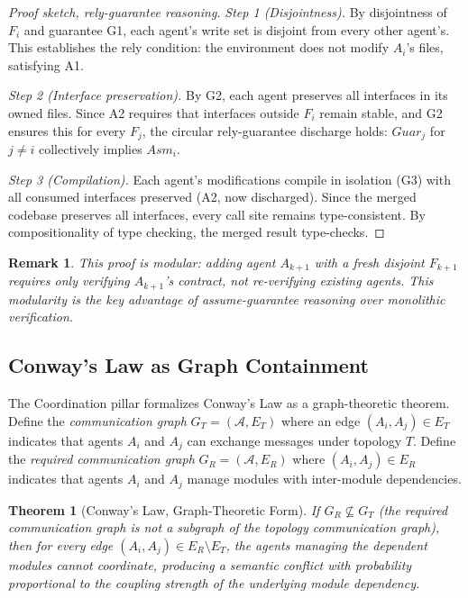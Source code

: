 \documentclass[11pt, a4paper, logo, copyright]{googledeepmind}
\newtheorem{theorem}{Theorem}[section]
\newtheorem*{remark}{Remark}
\begin{document}
\begin{proof}[Proof sketch, rely-guarantee reasoning]
\textit{Step 1 (Disjointness).}
By disjointness of $F_i$ and guarantee G1, each agent's write set is disjoint from every other agent's. This establishes the rely condition: the environment does not modify $A_i$'s files, satisfying A1.

\textit{Step 2 (Interface preservation).}
By G2, each agent preserves all interfaces in its owned files. Since A2 requires that interfaces outside $F_i$ remain stable, and G2 ensures this for every $F_j$, the circular rely-guarantee discharge holds: $Guar_j$ for $j \neq i$ collectively implies $Asm_i$.

\textit{Step 3 (Compilation).}
Each agent's modifications compile in isolation (G3) with all consumed interfaces preserved (A2, now discharged). Since the merged codebase preserves all interfaces, every call site remains type-consistent. By compositionality of type checking, the merged result type-checks.
\end{proof}

\begin{remark}
This proof is modular: adding agent $A_{k+1}$ with a fresh disjoint $F_{k+1}$ requires only verifying $A_{k+1}$'s contract, not re-verifying existing agents. This modularity is the key advantage of assume-guarantee reasoning over monolithic verification.
\end{remark}

\subsection{Conway's Law as Graph Containment}

The Coordination pillar formalizes Conway's Law as a graph-theoretic theorem. Define the \emph{communication graph} $G_T = (\mathcal{A}, E_T)$ where an edge $(A_i, A_j) \in E_T$ indicates that agents $A_i$ and $A_j$ can exchange messages under topology $T$. Define the \emph{required communication graph} $G_R = (\mathcal{A}, E_R)$ where $(A_i, A_j) \in E_R$ indicates that agents $A_i$ and $A_j$ manage modules with inter-module dependencies.

\begin{theorem}[Conway's Law, Graph-Theoretic Form]
\label{thm:conway}
If $G_R \not\subseteq G_T$ (the required communication graph is not a subgraph of the topology communication graph), then for every edge $(A_i, A_j) \in E_R \setminus E_T$, the agents managing the dependent modules cannot coordinate, producing a semantic conflict with probability proportional to the coupling strength of the underlying module dependency.
\end{theorem}
\end{document}
